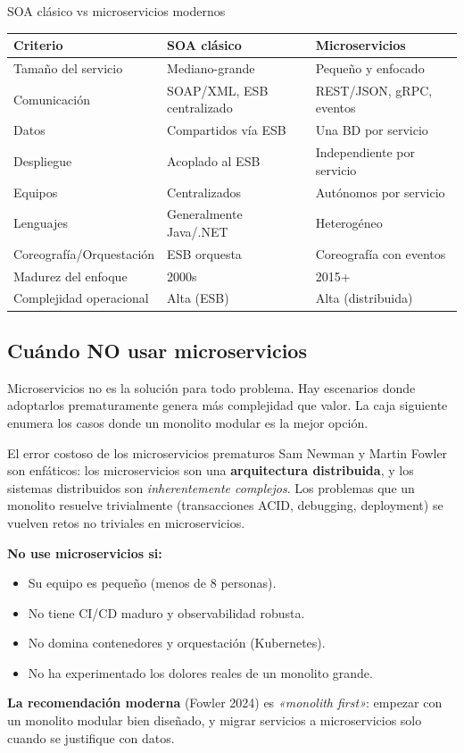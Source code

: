 \documentclass[11pt,a4paper,openany]{book}
\begin{document}
\begin{cajacompara}{SOA clásico vs microservicios modernos}
\centering\footnotesize
\begin{tabularx}{\textwidth}{lXX}
\toprule
\textbf{Criterio} & \textbf{SOA clásico} & \textbf{Microservicios}\\
\midrule
Tamaño del servicio & Mediano-grande & Pequeño y enfocado\\
Comunicación & SOAP/XML, ESB centralizado & REST/JSON, gRPC, eventos\\
Datos & Compartidos vía ESB & Una BD por servicio\\
Despliegue & Acoplado al ESB & Independiente por servicio\\
Equipos & Centralizados & Autónomos por servicio\\
Lenguajes & Generalmente Java/.NET & Heterogéneo\\
Coreografía/Orquestación & ESB orquesta & Coreografía con eventos\\
Madurez del enfoque & 2000s & 2015+\\
Complejidad operacional & Alta (ESB) & Alta (distribuida)\\
\bottomrule
\end{tabularx}
\end{cajacompara}

\subsection{Cuándo NO usar microservicios}

Microservicios no es la solución para todo problema. Hay
escenarios donde adoptarlos prematuramente genera más complejidad
que valor. La caja siguiente enumera los casos donde un monolito
modular es la mejor opción.


\begin{cajaadvertencia}{El error costoso de los microservicios prematuros}
Sam Newman y Martin Fowler son enfáticos: los microservicios son
una \textbf{arquitectura distribuida}, y los sistemas distribuidos
son \emph{inherentemente complejos}. Los problemas que un monolito
resuelve trivialmente (transacciones ACID, debugging,
deployment) se vuelven retos no triviales en microservicios.

\textbf{No use microservicios si:}
\begin{itemize}
\item Su equipo es pequeño (menos de 8 personas).
\item No tiene CI/CD maduro y observabilidad robusta.
\item No domina contenedores y orquestación (Kubernetes).
\item No ha experimentado los dolores reales de un monolito grande.
\end{itemize}

\textbf{La recomendación moderna} (Fowler 2024) es \emph{«monolith
first»}: empezar con un monolito modular bien diseñado, y migrar
servicios a microservicios solo cuando se justifique con datos.
\end{cajaadvertencia}
\end{document}
